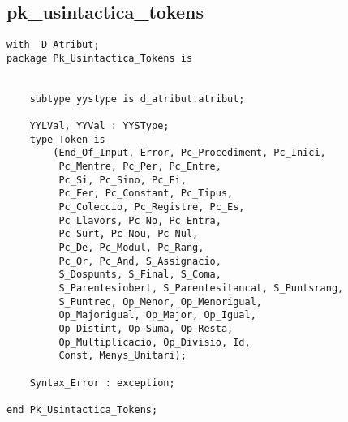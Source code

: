 \documentclass[10pt]{report}
\begin{document}
    \subsection{pk\_usintactica\_tokens}
    \begin{lstlisting}[style=Ada]
with  D_Atribut;
package Pk_Usintactica_Tokens is


    subtype yystype is d_atribut.atribut;

    YYLVal, YYVal : YYSType; 
    type Token is
        (End_Of_Input, Error, Pc_Procediment, Pc_Inici,
         Pc_Mentre, Pc_Per, Pc_Entre,
         Pc_Si, Pc_Sino, Pc_Fi,
         Pc_Fer, Pc_Constant, Pc_Tipus,
         Pc_Coleccio, Pc_Registre, Pc_Es,
         Pc_Llavors, Pc_No, Pc_Entra,
         Pc_Surt, Pc_Nou, Pc_Nul,
         Pc_De, Pc_Modul, Pc_Rang,
         Pc_Or, Pc_And, S_Assignacio,
         S_Dospunts, S_Final, S_Coma,
         S_Parentesiobert, S_Parentesitancat, S_Puntsrang,
         S_Puntrec, Op_Menor, Op_Menorigual,
         Op_Majorigual, Op_Major, Op_Igual,
         Op_Distint, Op_Suma, Op_Resta,
         Op_Multiplicacio, Op_Divisio, Id,
         Const, Menys_Unitari);

    Syntax_Error : exception;

end Pk_Usintactica_Tokens;
    \end{lstlisting}
    \newpage
    
\end{document}
